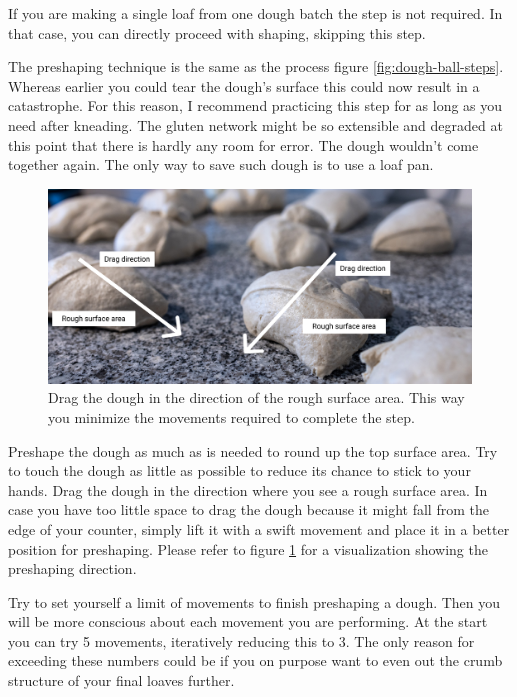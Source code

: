 If you are making a single loaf from one dough batch the step is not required.
In that case, you can directly proceed with shaping, skipping this step.
  
The preshaping technique is the same as the process figure \ref{fig:dough-ball-steps}.
Whereas earlier you could tear the dough's surface this could now result in a catastrophe.
For this reason, I recommend practicing this step for as long as you need after kneading.
The gluten network might be so extensible and degraded at this point that there
is hardly any room for error. The dough wouldn't come together again. The only
way to save such dough is to use a loaf pan.

\begin{figure}[!htb]
  \includegraphics[width=\textwidth]{preshape-direction}
  \caption{Drag the dough in the direction of the rough surface area. This
  way you minimize the movements required to complete the step.}
  \label{fig:preshape-direction}
\end{figure}

Preshape the dough as much as is needed to round up the top
surface area. Try to touch the dough as little as possible
to reduce its chance to stick to your hands. Drag the dough
in the direction where you see a rough surface area. In
case you have too little space to drag the dough because it might
fall from the edge of your counter, simply lift it with a swift movement and place
it in a better position for preshaping. Please refer to figure \ref{fig:preshape-direction}
for a visualization showing the preshaping direction.

Try to set yourself a limit of movements to finish preshaping
a dough. Then you will be more conscious about each movement
you are performing. At the start you can try 5 movements,
iteratively reducing this to 3. The only reason for exceeding these
numbers could be if you on purpose want to even out the crumb
structure of your final loaves further.

